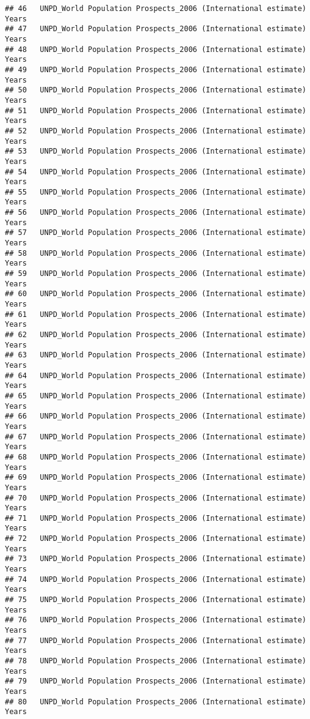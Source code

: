 \documentclass[]{article}
\begin{document}
\begin{verbatim}
## 46   UNPD_World Population Prospects_2006 (International estimate) Years
## 47   UNPD_World Population Prospects_2006 (International estimate) Years
## 48   UNPD_World Population Prospects_2006 (International estimate) Years
## 49   UNPD_World Population Prospects_2006 (International estimate) Years
## 50   UNPD_World Population Prospects_2006 (International estimate) Years
## 51   UNPD_World Population Prospects_2006 (International estimate) Years
## 52   UNPD_World Population Prospects_2006 (International estimate) Years
## 53   UNPD_World Population Prospects_2006 (International estimate) Years
## 54   UNPD_World Population Prospects_2006 (International estimate) Years
## 55   UNPD_World Population Prospects_2006 (International estimate) Years
## 56   UNPD_World Population Prospects_2006 (International estimate) Years
## 57   UNPD_World Population Prospects_2006 (International estimate) Years
## 58   UNPD_World Population Prospects_2006 (International estimate) Years
## 59   UNPD_World Population Prospects_2006 (International estimate) Years
## 60   UNPD_World Population Prospects_2006 (International estimate) Years
## 61   UNPD_World Population Prospects_2006 (International estimate) Years
## 62   UNPD_World Population Prospects_2006 (International estimate) Years
## 63   UNPD_World Population Prospects_2006 (International estimate) Years
## 64   UNPD_World Population Prospects_2006 (International estimate) Years
## 65   UNPD_World Population Prospects_2006 (International estimate) Years
## 66   UNPD_World Population Prospects_2006 (International estimate) Years
## 67   UNPD_World Population Prospects_2006 (International estimate) Years
## 68   UNPD_World Population Prospects_2006 (International estimate) Years
## 69   UNPD_World Population Prospects_2006 (International estimate) Years
## 70   UNPD_World Population Prospects_2006 (International estimate) Years
## 71   UNPD_World Population Prospects_2006 (International estimate) Years
## 72   UNPD_World Population Prospects_2006 (International estimate) Years
## 73   UNPD_World Population Prospects_2006 (International estimate) Years
## 74   UNPD_World Population Prospects_2006 (International estimate) Years
## 75   UNPD_World Population Prospects_2006 (International estimate) Years
## 76   UNPD_World Population Prospects_2006 (International estimate) Years
## 77   UNPD_World Population Prospects_2006 (International estimate) Years
## 78   UNPD_World Population Prospects_2006 (International estimate) Years
## 79   UNPD_World Population Prospects_2006 (International estimate) Years
## 80   UNPD_World Population Prospects_2006 (International estimate) Years

\end{verbatim}
\end{document}
